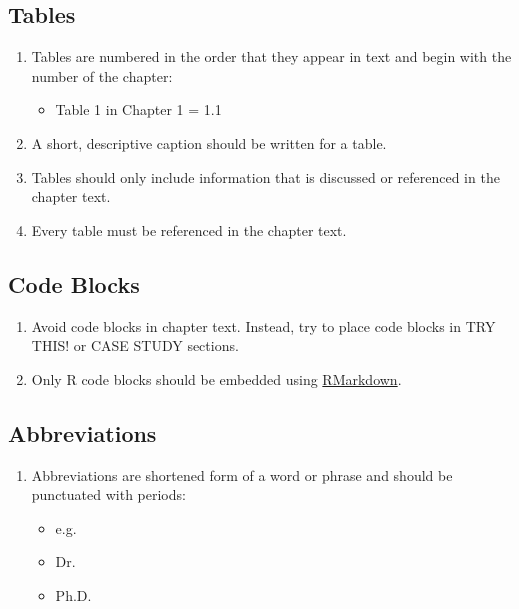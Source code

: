 \documentclass[
]{book}
\providecommand{\tightlist}{%
  \setlength{\itemsep}{0pt}\setlength{\parskip}{0pt}}
\begin{document}
\hypertarget{tables}{%
\subsection{Tables}\label{tables}}

\begin{enumerate}
\def\labelenumi{\arabic{enumi}.}
\tightlist
\item
  Tables are numbered in the order that they appear in text and begin with the number of the chapter:

  \begin{itemize}
  \tightlist
  \item
    Table 1 in Chapter 1 = 1.1
  \end{itemize}
\item
  A short, descriptive caption should be written for a table.
\item
  Tables should only include information that is discussed or referenced in the chapter text.
\item
  Every table must be referenced in the chapter text.
\end{enumerate}

\hypertarget{code-blocks}{%
\subsection{Code Blocks}\label{code-blocks}}

\begin{enumerate}
\def\labelenumi{\arabic{enumi}.}
\tightlist
\item
  Avoid code blocks in chapter text. Instead, try to place code blocks in TRY THIS! or CASE STUDY sections.
\item
  Only R code blocks should be embedded using \href{https://bookdown.org/yihui/rmarkdown/r-code.html}{RMarkdown}.
\end{enumerate}

\hypertarget{abbreviations}{%
\subsection{Abbreviations}\label{abbreviations}}

\begin{enumerate}
\def\labelenumi{\arabic{enumi}.}
\tightlist
\item
  Abbreviations are shortened form of a word or phrase and should be punctuated with periods:

  \begin{itemize}
  \tightlist
  \item
    e.g.
  \item
    Dr.
  \item
    Ph.D.
  \end{itemize}
\end{enumerate}
\end{document}
